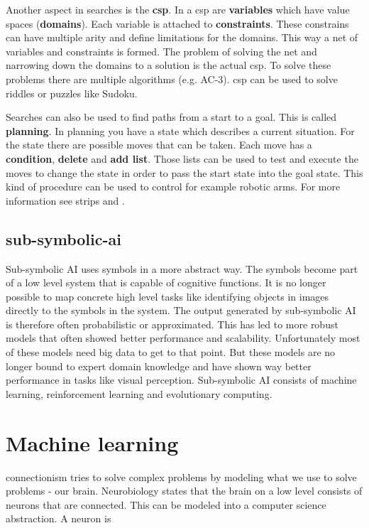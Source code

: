 \documentclass[jou,apacite]{apa6}
\begin{document}
Another aspect in searches is the \textbf{\gls{csp}}. In a \gls{csp} are \textbf{variables} which have value spaces (\textbf{domains}). Each variable is attached to \textbf{constraints}. These constrains can have multiple arity and define limitations for the domains. 
This way a net of variables and constraints is formed. The problem of solving the net and narrowing down the domains to a solution is the actual \gls{csp}. To solve these problems there are multiple algorithms (e.g. AC-3). \gls{csp} can be used to solve riddles or puzzles like Sudoku.

Searches can also be used to find paths from a start to a goal. This is called \textbf{planning}. In planning you have a state which describes a current situation. For the state there are possible moves that can be taken. Each move has a \textbf{condition}, \textbf{delete} and \textbf{add list}. Those lists can be used to test and execute the moves to change the state in order to pass the start state into the goal state. This kind of procedure can be used to control for example robotic arms. For more information see \gls{strips} and \cite{Nilsson1982}.

\subsection{\gls{sub-symbolic-ai}}
Sub-symbolic AI uses symbols in a more abstract way. The symbols become part of a low level system that is capable of cognitive functions. It is no longer possible to map concrete high level tasks like identifying objects in images directly to the symbols in the system. The output generated by sub-symbolic AI is therefore often probabilistic or approximated. This has led to more robust models that often showed better performance and scalability. Unfortunately most of these models need big data to get to that point. But these models are no longer bound to expert domain knowledge and have shown way better performance in tasks like visual perception. Sub-symbolic AI consists of machine learning, reinforcement learning and evolutionary computing.

\section{Machine learning}

\gls{connectionism} tries to solve complex problems by modeling what we use to solve problems - our brain. Neurobiology states that the brain on a low level consists of neurons that are connected. This can be modeled into a computer science abstraction. A neuron is 
\end{document}
